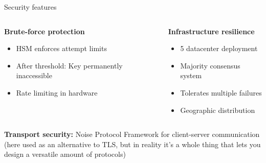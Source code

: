 \documentclass[aspectratio=169, lualatex, handout]{beamer}
\begin{document}
\begin{frame}{Security features}
	\begin{columns}[c]
		\begin{column}{0.5\textwidth}
			\textbf{Brute-force protection}
			\begin{itemize}
				\item HSM enforces attempt limits
				\item After threshold: Key permanently inaccessible
				\item Rate limiting in hardware
			\end{itemize}
		\end{column}
		\begin{column}{0.5\textwidth}
			\textbf{Infrastructure resilience}
			\begin{itemize}
				\item 5 datacenter deployment
				\item Majority consensus system
				\item Tolerates multiple failures
				\item Geographic distribution
			\end{itemize}
		\end{column}
	\end{columns}
	\vspace{0.5cm}
	\begin{center}
		\textbf{Transport security:} Noise Protocol Framework for client-server communication (here used as an alternative to TLS, but in reality it's a whole thing that lets you design a versatile amount of protocols)
	\end{center}
\end{frame}
\end{document}
